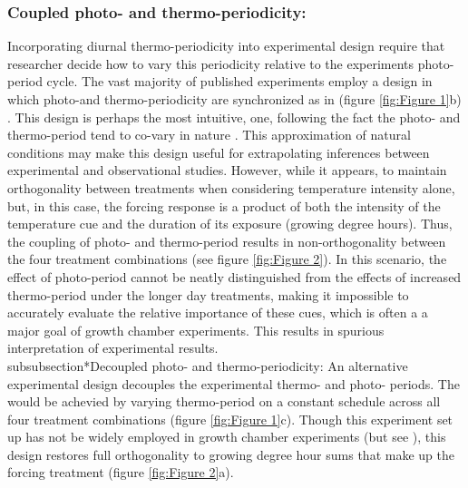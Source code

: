 \documentclass{article}[11pt]
\begin{document}
\subsubsection*{Coupled photo- and thermo-periodicity:}
\indent\indent Incorporating diurnal thermo-periodicity into experimental design require that researcher decide how to vary this periodicity relative to the experiments photo-period cycle. The vast majority of published experiments employ a design in which photo-and thermo-periodicity are synchronized as in (figure \ref{fig:Figure 1}b) \citep{Ettinger_inprep}. This design is perhaps the most intuitive, one,  following the fact the photo- and thermo-period tend to co-vary in nature \citep{Rosenberg1974}. This approximation of natural conditions may make this design useful for extrapolating inferences between experimental and observational studies. However, while it appears, to maintain orthogonality between treatments when considering temperature intensity alone, but, in this case, the forcing response is a product of both the intensity of the temperature cue and the duration of its exposure (growing degree hours).  Thus, the coupling of photo- and thermo-period results in non-orthogonality between the four treatment combinations (see figure \ref{fig:Figure 2}). In this scenario, the effect of photo-period cannot be neatly distinguished from the effects of increased thermo-period under the longer day treatments, making it impossible to accurately evaluate the relative importance of these cues, which is often a a major goal of growth chamber experiments. This results in spurious interpretation of experimental results.\\

subsubsection*{Decoupled photo- and thermo-periodicity:}
 \indent \indent An alternative experimental design decouples the experimental thermo- and photo- periods. The would be achevied by varying thermo-period on a constant schedule across all four treatment combinations (figure \ref{fig:Figure 1}c). Though this experiment set up has not be widely employed in growth chamber experiments (but see \citep{Buonaiuto2020}), this design restores full orthogonality to growing degree hour sums that make up the forcing treatment (figure \ref{fig:Figure 2}a).\\
 
\end{document}
